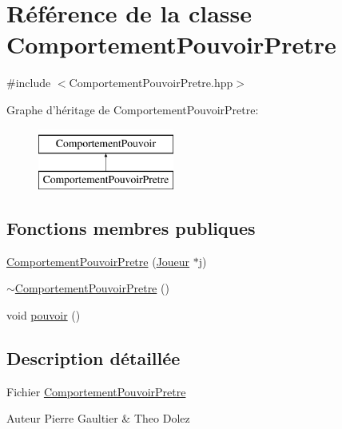 \hypertarget{class_comportement_pouvoir_pretre}{\section{\-Référence de la classe \-Comportement\-Pouvoir\-Pretre}
\label{class_comportement_pouvoir_pretre}
}


{\ttfamily \#include $<$\-Comportement\-Pouvoir\-Pretre.\-hpp$>$}

\-Graphe d'héritage de \-Comportement\-Pouvoir\-Pretre\-:\begin{figure}[H]
\begin{center}
\leavevmode
\includegraphics[height=2.000000cm]{class_comportement_pouvoir_pretre}
\end{center}
\end{figure}
\subsection*{\-Fonctions membres publiques}
\begin{DoxyCompactItemize}
\item 
\hyperlink{class_comportement_pouvoir_pretre_a997a0441eabec5c50a1cfa29d9aabdaa}{\-Comportement\-Pouvoir\-Pretre} (\hyperlink{class_joueur}{\-Joueur} $\ast$j)
\item 
\hyperlink{class_comportement_pouvoir_pretre_a5232928218a13a88d8f1d4aecf440147}{$\sim$\-Comportement\-Pouvoir\-Pretre} ()
\item 
void \hyperlink{class_comportement_pouvoir_pretre_a24e87d9b2cb5ab4116d67ace5d3c9687}{pouvoir} ()
\end{DoxyCompactItemize}


\subsection{\-Description détaillée}
\-Fichier \hyperlink{class_comportement_pouvoir_pretre}{\-Comportement\-Pouvoir\-Pretre} \begin{DoxyAuthor}{\-Auteur}
\-Pierre \-Gaultier \& \-Theo \-Dolez 
\end{DoxyAuthor}


